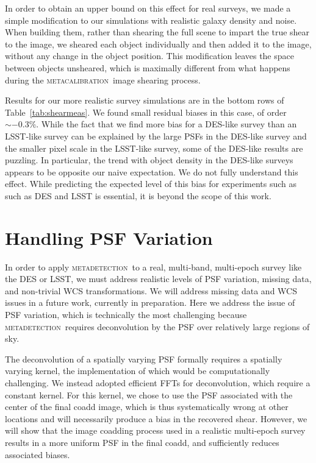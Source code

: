 \documentclass[fleqn,useAMS,usenatbib]{mnras}
\newcommand{\mcal}{\textsc{metacalibration}}
\newcommand{\mdet}{\textsc{metadetection}}
\begin{document}
In order to obtain an upper bound on this effect for real surveys, we made a
simple modification to our simulations with realistic galaxy density and noise.
When building them, rather than shearing the full scene to impart the true
shear to the image, we sheared each object individually and then added it to
the image, without any change in the object position. This modification leaves
the space between objects unsheared, which is maximally different from what
happens during the \mcal\ image shearing process.

Results for our more realistic survey simulations are in the bottom rows
of Table~\ref{tab:shearmeas}. We found small residual biases in this case,
of order $\sim-0.3\%$. While the fact that we find more bias for a DES-like
survey than an LSST-like survey can be explained by the large PSFs in the
DES-like survey and the smaller pixel scale in the LSST-like survey, some of
the DES-like results are puzzling. In particular, the trend with object density
in the DES-like surveys appears to be opposite our naive expectation. We do
not fully understand this effect. While predicting the expected level of this
bias for experiments such as such as DES and LSST is essential, it is beyond
the scope of this work.

\section{Handling PSF Variation}
\label{sec:psfvar}

In order to apply \mdet\ to a real, multi-band, multi-epoch survey like the DES
or LSST, we must address realistic levels of PSF variation, missing data, and
non-trivial WCS transformations. We will address missing data and WCS issues in
a future work, currently in preparation. Here we address the issue of PSF
variation, which is technically the most challenging because \mdet\ requires
deconvolution by the PSF over relatively large regions of sky.

The deconvolution of a spatially varying PSF formally requires a spatially
varying kernel, the implementation of which would be computationally
challenging.  We instead adopted efficient FFTs for deconvolution, which require
a constant kernel.  For this kernel, we chose to use the PSF associated with
the center of the final coadd image, which is thus systematically wrong at
other locations and will necessarily produce a bias in the recovered shear.
However, we will show that the image coadding process used in a realistic
multi-epoch survey results in a more uniform PSF in the final coadd, and
sufficiently reduces associated biases.
\end{document}
